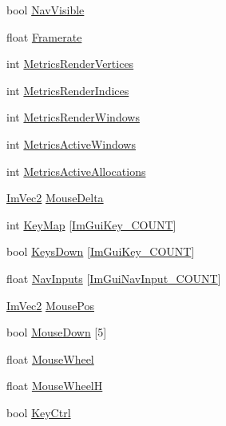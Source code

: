 \begin{DoxyCompactItemize}
\item 
bool \hyperlink{structImGuiIO_a904bb563ee00c92cc6b6b072df2c7405}{Nav\+Visible}
\item 
float \hyperlink{structImGuiIO_a8c6c2be54ddeda3cfb4a73cf95701a54}{Framerate}
\item 
int \hyperlink{structImGuiIO_a8ec9d203f4543047a8820366c5734529}{Metrics\+Render\+Vertices}
\item 
int \hyperlink{structImGuiIO_a19daed6a7fa22819fe187dfc2a2f5683}{Metrics\+Render\+Indices}
\item 
int \hyperlink{structImGuiIO_aec04d38a9b3799d12259a672c42e7c7e}{Metrics\+Render\+Windows}
\item 
int \hyperlink{structImGuiIO_ae47a71018cc9b0c7b55912a4bfa9149c}{Metrics\+Active\+Windows}
\item 
int \hyperlink{structImGuiIO_a206a2d9a6b3adf9503b4d4c40abc6f7a}{Metrics\+Active\+Allocations}
\item 
\hyperlink{structImVec2}{Im\+Vec2} \hyperlink{structImGuiIO_a5b5cc0c171104337e3e7e13a8f7b0938}{Mouse\+Delta}
\item 
int \hyperlink{structImGuiIO_aa1cd0083960f8e5361eb6d49973c8823}{Key\+Map} \mbox{[}\hyperlink{imgui_8h_aa22ffe36b188427d712447ec465203d4aec3107a9dcdc5632cdcd57d4f8bbed18}{Im\+Gui\+Key\+\_\+\+C\+O\+U\+NT}\mbox{]}
\item 
bool \hyperlink{structImGuiIO_a59f88f4933f391741450f8548cb46eab}{Keys\+Down} \mbox{[}\hyperlink{imgui_8h_aa22ffe36b188427d712447ec465203d4aec3107a9dcdc5632cdcd57d4f8bbed18}{Im\+Gui\+Key\+\_\+\+C\+O\+U\+NT}\mbox{]}
\item 
float \hyperlink{structImGuiIO_a1e6e8142c2c2e09a715fa5efaa0db9fa}{Nav\+Inputs} \mbox{[}\hyperlink{imgui_8h_ac127e1a0a29c7abca4922e206d0c2991a649aced582f4c80f70b83814051ffcb3}{Im\+Gui\+Nav\+Input\+\_\+\+C\+O\+U\+NT}\mbox{]}
\item 
\hyperlink{structImVec2}{Im\+Vec2} \hyperlink{structImGuiIO_ad2e9e547cb4d2abe8e7d27407efffeb8}{Mouse\+Pos}
\item 
bool \hyperlink{structImGuiIO_a8f4613baafc93026175d9cdaf4e82d21}{Mouse\+Down} \mbox{[}5\mbox{]}
\item 
float \hyperlink{structImGuiIO_a21d3ca4928989a2c838b7b4ea95e5824}{Mouse\+Wheel}
\item 
float \hyperlink{structImGuiIO_a25bed9de908b086e583854438ca7927d}{Mouse\+WheelH}
\item 
bool \hyperlink{structImGuiIO_a51de8f65dcabb80ef4e0d3c759ffcd7f}{Key\+Ctrl}
\item 

\end{DoxyCompactItemize}
